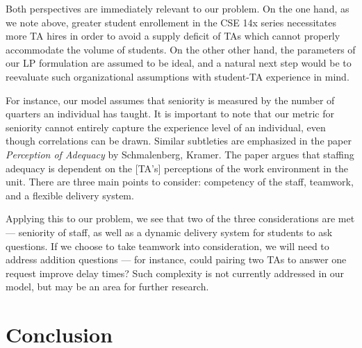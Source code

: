 \documentclass{article}
\begin{document}
\begin{multicols}{2}
Both perspectives are immediately relevant to our problem. On the one hand, as we note above, greater student enrollement in the CSE 14x series necessitates more TA hires in order to avoid a supply deficit of TAs which cannot properly accommodate the volume of students. On the other other hand, the parameters of our LP formulation are assumed to be ideal, and a natural next step would be to reevaluate such organizational assumptions with student-TA experience in mind.

For instance, our model assumes that seniority is measured by the number of quarters an individual has taught. It is important to note that our metric for seniority cannot entirely capture the experience level of an individual, even though correlations can be drawn. Similar subtleties are emphasized in the paper \textit{Perception of Adequacy} by Schmalenberg, Kramer. The paper argues that staffing adequacy is dependent on the [TA’s] perceptions of the work environment in the unit. There are three main points to consider: competency of the staff, teamwork, and a flexible delivery system.

Applying this to our problem, we see that two of the three considerations are met — seniority of staff, as well as a dynamic delivery system for students to ask questions. If we choose to take teamwork into consideration, we will need to address addition questions — for instance, could pairing two TAs to answer one request improve delay times? Such complexity is not currently addressed in our model, but may be an area for further research.

\section*{Conclusion}


\end{multicols}
\end{document}
